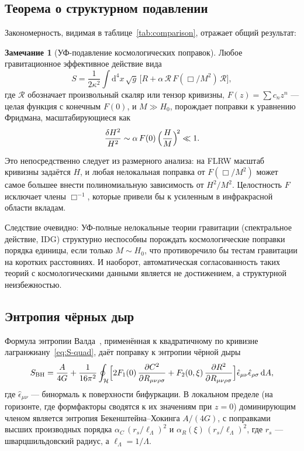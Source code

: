 \documentclass[12pt,a4paper]{article}
\newcommand{\dd}{\mathrm{d}}
\newcommand{\Lam}{\Lambda}
\theoremstyle{plain}
\theoremstyle{definition}
\newtheorem{remark}[theorem]{Замечание}
\begin{document}
\subsection{Теорема о структурном подавлении}

Закономерность, видимая в таблице~\ref{tab:comparison}, отражает общий
результат:

\begin{remark}[УФ-подавление космологических поправок]
\label{prop:UV-suppression}
Любое гравитационное эффективное действие вида
\begin{equation}\label{eq:generic-NLG}
  S = \frac{1}{2\kappa^2}\int\dd^4x\,\sqrt{g}\,
  \bigl[R + \alpha\,\mathcal{R}\,F(\Box/M^2)\,\mathcal{R}\bigr],
\end{equation}
где $\mathcal{R}$ обозначает произвольный скаляр или тензор кривизны,
$F(z) = \sum c_n z^n$ --- целая функция с конечным $F(0)$, и
$M \gg H_0$, порождает поправки к уравнению Фридмана, масштабирующиеся
как
\begin{equation}\label{eq:UV-scaling}
  \frac{\delta H^2}{H^2} \sim \alpha\,F(0)\,
  \Bigl(\frac{H}{M}\Bigr)^{\!2} \ll 1.
\end{equation}
\end{remark}

\noindent
Это непосредственно следует из размерного анализа: на FLRW масштаб
кривизны задаётся $H$, и любая нелокальная поправка от $F(\Box/M^2)$
может самое большее внести полиномиальную зависимость от $H^2/M^2$.
Целостность $F$ исключает члены $\Box^{-1}$, которые привели бы к
усиленным в инфракрасной области вкладам.

Следствие очевидно: УФ-полные нелокальные теории гравитации (спектральное действие, IDG)
структурно неспособны порождать космологические поправки порядка единицы,
если только $M \sim H_0$, что противоречило бы тестам гравитации на
коротких расстояниях.  И наоборот, автоматическая согласованность таких
теорий с космологическими данными является не достижением, а структурной
неизбежностью.

\subsection{Энтропия чёрных дыр}

Формула энтропии Валда~\cite{Wald:1993nt}, применённая к квадратичному
по кривизне лагранжиану~\eqref{eq:S-quad}, даёт поправку к энтропии
чёрной дыры
\begin{equation}\label{eq:wald-entropy}
  S_{\mathrm{BH}} = \frac{A}{4G}
  + \frac{1}{16\pi^2}\oint_{\mathcal{H}}
  \Bigl[2F_1(0)\,\frac{\partial C^2}{\partial R_{\mu\nu\rho\sigma}}
  + F_2(0,\xi)\,\frac{\partial R^2}
  {\partial R_{\mu\nu\rho\sigma}}\Bigr]
  \hat{\epsilon}_{\mu\nu}\hat{\epsilon}_{\rho\sigma}\,\dd A,
\end{equation}
где $\hat{\epsilon}_{\mu\nu}$ --- бинормаль к поверхности бифуркации.
В локальном пределе (на горизонте, где формфакторы сводятся к их
значениям при $z = 0$) доминирующим членом является энтропия
Бекенштейна--Хокинга $A/(4G)$, с поправками высших производных порядка
$\alpha_C\,(r_s/\ell_\Lam)^2$ и $\alpha_R(\xi)\,(r_s/\ell_\Lam)^2$,
где $r_s$ --- шварцшильдовский радиус, а $\ell_\Lam = 1/\Lam$.
\end{document}
